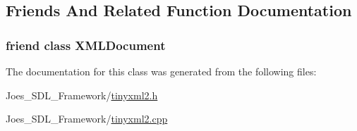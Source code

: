 \subsection{Friends And Related Function Documentation}
\hypertarget{classtinyxml2_1_1_x_m_l_declaration_a4eee3bda60c60a30e4e8cd4ea91c4c6e}{
\subsubsection[{X\-M\-L\-Document}]{\setlength{\rightskip}{0pt plus 5cm}friend class {\bf X\-M\-L\-Document}\hspace{0.3cm}{\ttfamily [friend]}}}\label{classtinyxml2_1_1_x_m_l_declaration_a4eee3bda60c60a30e4e8cd4ea91c4c6e}


The documentation for this class was generated from the following files\-:\begin{DoxyCompactItemize}
\item 
Joes\-\_\-\-S\-D\-L\-\_\-\-Framework/\hyperlink{tinyxml2_8h}{tinyxml2.\-h}\item 
Joes\-\_\-\-S\-D\-L\-\_\-\-Framework/\hyperlink{tinyxml2_8cpp}{tinyxml2.\-cpp}\end{DoxyCompactItemize}

